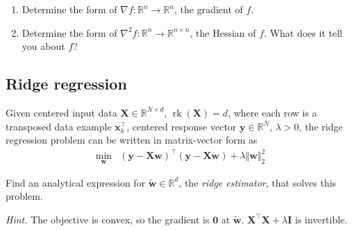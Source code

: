 \documentclass{article}
\numberwithin{equation}{section}
\begin{document}
\begin{enumerate}[label = \alph*.]
    \item
    Determine the form of $ \nabla f : \mathbb{R}^n \rightarrow
    \mathbb{R}^n $, the gradient of $ f $.

    \item
    Determine the form of $ \nabla^2f : \mathbb{R}^n \rightarrow
    \mathbb{R}^{n \times n} $, the Hessian of $ f $. What does it tell you
    about $ f $?
\end{enumerate}

\subsection{Ridge regression}

Given centered input data $ \mathbf{X} \in \mathbb{R}^{N \times d} $,
$ \operatorname{rk}(\mathbf{X}) = d $, where each row is a transposed data
example $ \mathbf{x}_k^\top $, centered\footnotemark{} response vector
$ \mathbf{y} \in \mathbb{R}^N $, $ \lambda > 0 $, the ridge regression problem
can be written in matrix-vector form as
\begin{equation*}
    \begin{array}{ll}
        \displaystyle\min_\mathbf{w} &
        (\mathbf{y} - \mathbf{Xw})^\top(\mathbf{y} - \mathbf{Xw}) +
        \lambda\Vert\mathbf{w}\Vert_2^2
    \end{array}
\end{equation*}

Find an analytical expression for $ \tilde{\mathbf{w}} \in \mathbb{R}^d $, the
\textit{ridge estimator}, that solves this problem.

\medskip

\textit{Hint.} The objective is convex, so the gradient is $ \mathbf{0} $ at
$ \tilde{\mathbf{w}} $. $ \mathbf{X}^\top\mathbf{X} + \lambda\mathbf{I} $ is
invertible.



\end{document}
